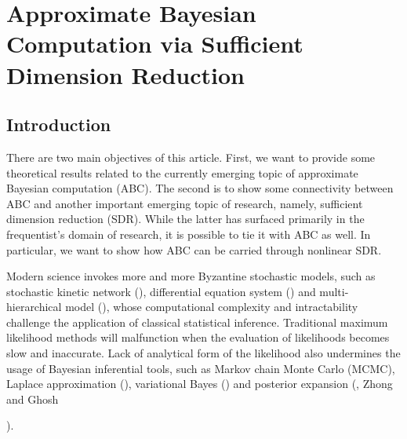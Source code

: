 \chapter{Approximate Bayesian Computation via Sufficient Dimension Reduction}


\section{Introduction}

There are two main objectives of this article. First, we want to provide
some theoretical results related to the currently emerging topic of
approximate Bayesian computation (ABC). The second is to show some
connectivity between ABC and another important emerging topic of research,
namely, sufficient dimension reduction (SDR). While the latter has
surfaced primarily in the{} frequentist's{}
domain of research, it is possible to tie it with ABC as well. In
particular, we want to show how ABC can be carried through nonlinear
SDR. 

Modern science invokes more and more Byzantine stochastic models,
such as stochastic kinetic network (\citet{wilkinson2011stochastic}),
differential equation system (\citet{picchini2014inference}) and
multi-hierarchical model (\citet{jasra2012filtering}), whose computational
complexity and intractability challenge the application of classical
statistical inference. Traditional maximum likelihood methods will
malfunction when the evaluation of likelihoods becomes slow and inaccurate.
Lack of analytical form of the likelihood also  {undermines
} the usage of Bayesian inferential tools, such as Markov chain Monte
Carlo (MCMC), Laplace approximation (\citet{tierney1986accurate}),
variational Bayes (\citet{jaakkola2000bayesian}) and posterior expansion
(\citet{johnson1970asymptotic}, Zhong and Ghosh%

). 

